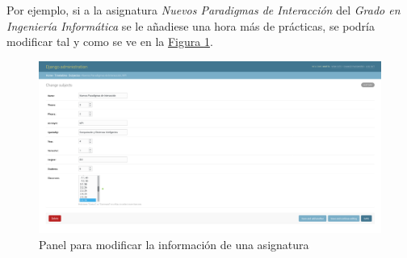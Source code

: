 Por ejemplo, si a la asignatura \textit{Nuevos Paradigmas de Interacción} del \textit{Grado en Ingeniería Informática} se le añadiese una hora más de prácticas, se podría modificar tal y como se ve en la \hyperref[djangoadminmodify]{Figura \ref*{djangoadminmodify}}.

\begin{figure}
\centering
\includegraphics[width=\textwidth]{img/djangoadminmodify}
\caption{Panel para modificar la información de una asignatura}
\label{djangoadminmodify}
\end{figure}
